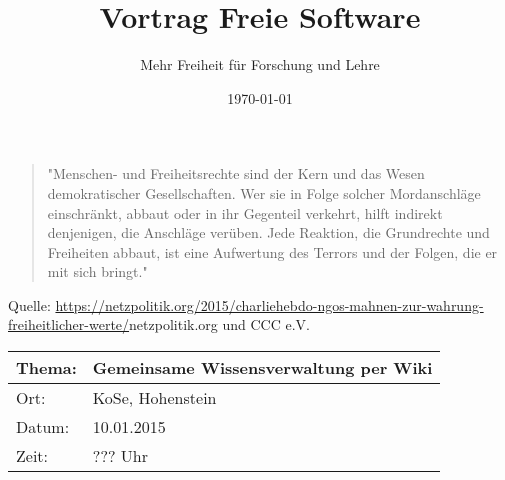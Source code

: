 \documentclass{beamer}              %
\title{Vortrag Freie Software}
\subtitle{Mehr Freiheit für Forschung und Lehre}
\date{\today}
\begin{document}

\begin{frame}
  \begin{center}
    \begin{quotation}
 "Menschen- und Freiheitsrechte sind der Kern und das Wesen demokratischer Gesellschaften. Wer sie in Folge solcher Mordanschläge einschränkt, abbaut oder in ihr Gegenteil verkehrt, hilft indirekt denjenigen, die Anschläge verüben. Jede Reaktion, die Grundrechte und Freiheiten abbaut, ist eine Aufwertung des Terrors und der Folgen, die er mit sich bringt."
    \end{quotation}
 Quelle: \url{https://netzpolitik.org/2015/charliehebdo-ngos-mahnen-zur-wahrung-freiheitlicher-werte/}{netzpolitik.org und CCC e.V.}
  \end{center}
\end{frame}

\begin{frame}
  \begin{center}
    \begin{longtable}{|l|l|}
      \hline
      
       \textbf{Thema:}        &  \textbf{Gemeinsame Wissensverwaltung per Wiki}                  \\ 
      \hline       
       Ort:                   &  KoSe, Hohenstein                                                \\ 
      \hline       
       Datum:                 &  10.01.2015                                                      \\
      \hline       
       Zeit:                  &  ??? Uhr                                               \\ 
      \hline       
    \end{longtable}
  \end{center}
\end{frame}
\end{document}
